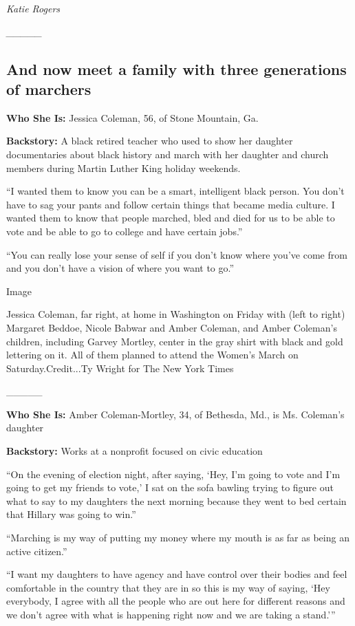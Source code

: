 \emph{Katie Rogers}

\emph{\_\_\_\_\_}

\hypertarget{and-now-meet-a-family-with-three-generations-of-marchers}{%
\subsection{And now meet a family with three generations of
marchers}\label{and-now-meet-a-family-with-three-generations-of-marchers}}

\textbf{Who She Is:} Jessica Coleman, 56, of Stone Mountain, Ga.

\textbf{Backstory:} A black retired teacher who used to show her
daughter documentaries about black history and march with her daughter
and church members during Martin Luther King holiday weekends.

``I wanted them to know you can be a smart, intelligent black person.
You don't have to sag your pants and follow certain things that became
media culture. I wanted them to know that people marched, bled and died
for us to be able to vote and be able to go to college and have certain
jobs.''

``You can really lose your sense of self if you don't know where you've
come from and you don't have a vision of where you want to go.''

Image

Jessica Coleman, far right, at home in Washington on Friday with (left
to right) Margaret Beddoe, Nicole Babwar and Amber Coleman, and Amber
Coleman's children, including Garvey Mortley, center in the gray shirt
with black and gold lettering on it. All of them planned to attend the
Women's March on Saturday.Credit...Ty Wright for The New York Times

\_\_\_\_\_

\textbf{Who She Is:} Amber Coleman-Mortley, 34, of Bethesda, Md., is Ms.
Coleman's daughter

\textbf{Backstory:} Works at a nonprofit focused on civic education

``On the evening of election night, after saying, `Hey, I'm going to
vote and I'm going to get my friends to vote,' I sat on the sofa bawling
trying to figure out what to say to my daughters the next morning
because they went to bed certain that Hillary was going to win.''

``Marching is my way of putting my money where my mouth is as far as
being an active citizen.''

``I want my daughters to have agency and have control over their bodies
and feel comfortable in the country that they are in so this is my way
of saying, `Hey everybody, I agree with all the people who are out here
for different reasons and we don't agree with what is happening right
now and we are taking a stand.'''

